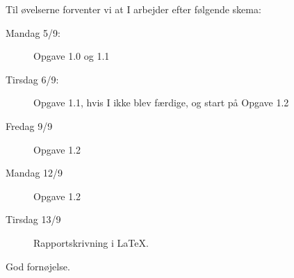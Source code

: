 \documentclass[a4paper,12pt]{article}
\begin{document}
Til øvelserne forventer vi at I arbejder efter følgende skema:
\begin{description}
\item[Mandag 5/9:] Opgave 1.0 og 1.1
\item[Tirsdag 6/9:] Opgave 1.1, hvis I ikke blev færdige, og start på Opgave 1.2
\item[Fredag 9/9]  Opgave 1.2
\item[Mandag 12/9] Opgave 1.2
\item[Tirsdag 13/9] Rapportskrivning i LaTeX.
\end{description}

\flushright God fornøjelse.
\end{document}
